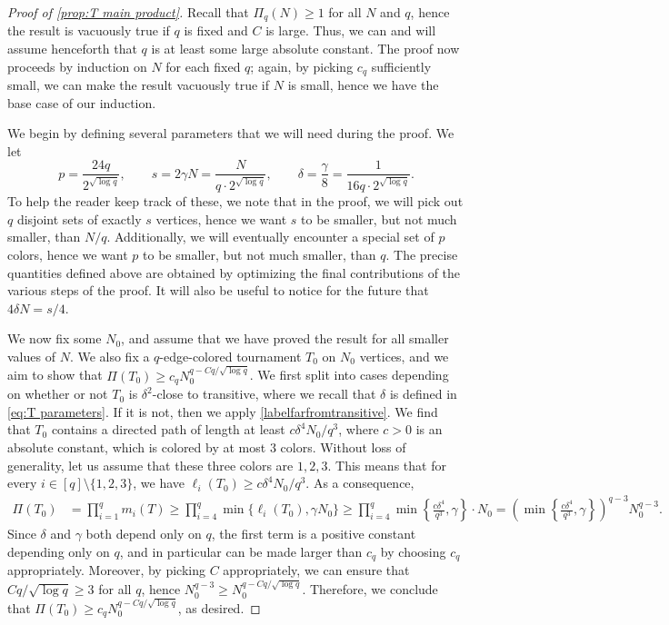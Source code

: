 \documentclass[10pt,a4paper]{amsart}
\begin{document}
\begin{proof}[Proof of \cref{prop:T main product}]
    Recall that $\Pi_q(N) \geq 1$ for all $N$ and $q$, hence the result is vacuously true if $q$ is fixed and $C$ is large. Thus, we can and will assume henceforth that $q$ is at least some large absolute constant. The proof now proceeds by induction on $N$ for each fixed $q$; again, by picking $c_q$ sufficiently small, we can make the result vacuously true if $N$ is small, hence we have the base case of our induction. 

    We begin by defining several parameters that we will need during the proof. We let 
    \begin{equation}\label{eq:T parameters}
        p = \frac{24q}{2^{\sqrt{\log q}}}, \qquad s =2\gamma N= \frac{N}{q\cdot 2^{\sqrt{\log q}}}, \qquad \delta=\frac \gamma 8 = \frac{1}{16 q\cdot 2^{\sqrt{\log q}}}.
    \end{equation}
    To help the reader keep track of these, we note that in the proof, we will pick out $q$ disjoint sets of exactly $s$ vertices, hence we want $s$ to be smaller, but not much smaller, than $N/q$. Additionally, we will eventually encounter a special set of $p$ colors, hence we want $p$ to be smaller, but not much smaller, than $q$. The precise quantities defined above are obtained by optimizing the final contributions of the various steps of the proof. It will also be useful to notice for the future that $4\delta N = s/4$.

    We now fix some $N_0$, and assume that we have proved the result for all smaller values of $N$. We also fix a $q$-edge-colored tournament $T_0$ on $N_0$ vertices, and we aim to show that $\Pi(T_0) \geq c_q N_0^{q-Cq/\sqrt{\log q}}$. We first split into cases depending on whether or not $T_0$ is $\delta^2$-close to transitive, where we recall that $\delta$ is defined in \eqref{eq:T parameters}. If it is not, then we apply \cref{labelfarfromtransitive}. We find that $T_0$ contains a directed path of length at least $c\delta^4 N_0/q^3$, where $c>0$ is an absolute constant, which is colored by at most $3$ colors. Without loss of generality, let us assume that these three colors are $1,2,3$. This means that for every $i \in [q]\setminus\{1,2,3\}$, we have $\ell_i(T_0) \geq c\delta^4 N_0/q^3$.  As a consequence,
    \begin{align*}
        \Pi(T_0) &=\prod_{i=1}^q m_i(T) \geq \prod_{i=4}^q \min\{\ell_i(T_0),\gamma N_0\} \geq \prod_{i=4}^q \min \left\{ \frac{c\delta^4}{q^3},\gamma \right\}\cdot N_0=\left( \min \left\{ \frac{c\delta^4}{q^3},\gamma \right\} \right)^{q-3} N_0^{q-3}.
    \end{align*}
    Since $\delta$ and $\gamma$ both depend only on $q$, the first term is a positive constant depending only on $q$, and in particular can be made larger than $c_q$ by choosing $c_q$ appropriately. Moreover, by picking $C$ appropriately, we can ensure that $Cq/\sqrt{\log q}\geq 3$ for all $q$, hence $N_0^{q-3}\geq N_0^{q-Cq/\sqrt{\log q}}$. Therefore, we conclude that $\Pi(T_0) \geq c_q N_0^{q-Cq/\sqrt{\log q}}$, as desired. 


\end{proof}
\end{document}
